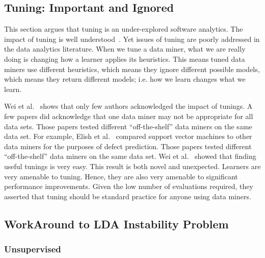 \documentclass[conference]{IEEEtran}
\theoremstyle{break}
\begin{document}
\subsection{Tuning: Important and Ignored}
\label{sect: tuning}

This section argues that tuning is an under-explored software analytics. The impact of tuning is well understood~\cite{bergstra2012random}. Yet issues of tuning are poorly addressed in the data analytics literature. When we tune a data miner, what we are really doing is changing how a learner applies its heuristics. This means tuned data miners use different heuristics, which means they ignore different possible models, which means they return different models; i.e. how we learn changes what we learn.

Wei et al.~\cite{fu2016tuning} shows that only few authors acknowledged the impact of tunings. A few papers did acknowledge that one data miner may not be appropriate for all data sets. Those papers tested different “off-the-shelf” data miners on the same data set. For example, Elish et al.~\cite{elish2008predicting} compared support vector machines to other data miners for the purposes of defect prediction. Those papers tested different “off-the-shelf” data miners on the same data set. Wei et al.~\cite{fu2016tuning} showed that finding useful tunings is very easy. This result is both novel and unexpected. Learners are very amenable to tuning. Hence, they are also very amenable to significant performance improvements. Given the low number of evaluations required, they asserted that tuning should be standard practice for anyone using data miners.

\subsection{WorkAround to LDA Instability Problem}
\label{sect: solutions}

\subsubsection{\textbf{Unsupervised}}
\hfill

\noindent{}
\end{document}
